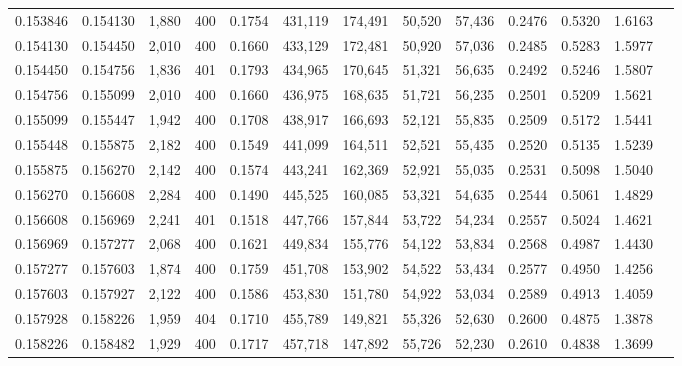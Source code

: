 \begin{tabular}{rrrrrrrrrrrrr}
0.153846 & 0.154130 & 1,880 & 400 &                                     0.1754 & 431,119 & 174,491 &  50,520 &  57,436 & 0.2476 & 0.5320 & 1.6163 \\
0.154130 & 0.154450 & 2,010 & 400 &                                     0.1660 & 433,129 & 172,481 &  50,920 &  57,036 & 0.2485 & 0.5283 & 1.5977 \\
0.154450 & 0.154756 & 1,836 & 401 &                                     0.1793 & 434,965 & 170,645 &  51,321 &  56,635 & 0.2492 & 0.5246 & 1.5807 \\
0.154756 & 0.155099 & 2,010 & 400 &                                     0.1660 & 436,975 & 168,635 &  51,721 &  56,235 & 0.2501 & 0.5209 & 1.5621 \\
0.155099 & 0.155447 & 1,942 & 400 &                                     0.1708 & 438,917 & 166,693 &  52,121 &  55,835 & 0.2509 & 0.5172 & 1.5441 \\
0.155448 & 0.155875 & 2,182 & 400 &                                     0.1549 & 441,099 & 164,511 &  52,521 &  55,435 & 0.2520 & 0.5135 & 1.5239 \\
0.155875 & 0.156270 & 2,142 & 400 &                                     0.1574 & 443,241 & 162,369 &  52,921 &  55,035 & 0.2531 & 0.5098 & 1.5040 \\
0.156270 & 0.156608 & 2,284 & 400 &                                     0.1490 & 445,525 & 160,085 &  53,321 &  54,635 & 0.2544 & 0.5061 & 1.4829 \\
0.156608 & 0.156969 & 2,241 & 401 &                                     0.1518 & 447,766 & 157,844 &  53,722 &  54,234 & 0.2557 & 0.5024 & 1.4621 \\
0.156969 & 0.157277 & 2,068 & 400 &                                     0.1621 & 449,834 & 155,776 &  54,122 &  53,834 & 0.2568 & 0.4987 & 1.4430 \\
0.157277 & 0.157603 & 1,874 & 400 &                                     0.1759 & 451,708 & 153,902 &  54,522 &  53,434 & 0.2577 & 0.4950 & 1.4256 \\
0.157603 & 0.157927 & 2,122 & 400 &                                     0.1586 & 453,830 & 151,780 &  54,922 &  53,034 & 0.2589 & 0.4913 & 1.4059 \\
0.157928 & 0.158226 & 1,959 & 404 &                                     0.1710 & 455,789 & 149,821 &  55,326 &  52,630 & 0.2600 & 0.4875 & 1.3878 \\
0.158226 & 0.158482 & 1,929 & 400 &                                     0.1717 & 457,718 & 147,892 &  55,726 &  52,230 & 0.2610 & 0.4838 & 1.3699 \\

\end{tabular}
